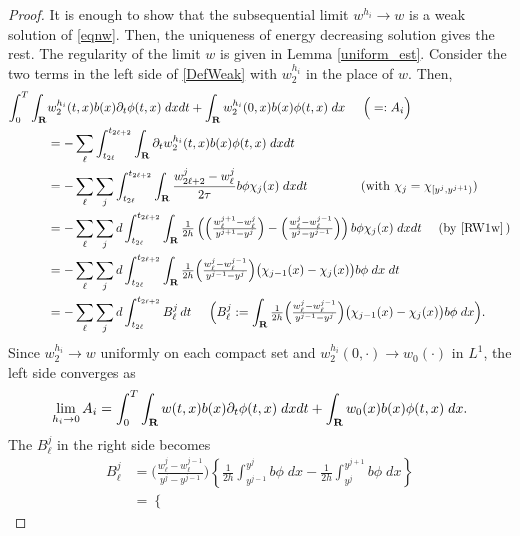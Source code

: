 \documentclass[11pt]{amsart}
\def\R{{\bf R}}
\def\R{{\bf R}}
\begin{document}
\begin{proof}
It is enough to show that the subsequential limit $w^{h_i}\to w$ is a weak solution of \eqref{eqnw}. Then, the uniqueness of energy decreasing solution gives the rest. The regularity of the limit $w$ is given in Lemma \ref{uniform_est}. Consider the two terms in the left side of \eqref{DefWeak} with $w_2^{h_i}$ in the place of $w$. Then,
\begin{align*}
 \int_0^T\int_\R& w_2^{h_i}(t,x)  b(x)\partial_t\phi(t,x)\; dx dt
 +\int_\R w_2^{h_i}(0,x) b(x)\phi(t,x) \; dx\hskip 5mm \Big(=:A_i\Big)\\
 &=-\sum_{\ell}\int_{t_{2\ell}}^{t_{2\ell+2}}\int_\R \partial_t
 w_2^{h_i}(t,x)  b(x)\phi(t,x)\; dx dt \\
 &=-\sum_{\ell}\sum_{j}\int_{t_{2\ell}}^{t_{2\ell+2}}\int_\R
 \frac{w^j_{2\ell+2}-w^j_{\ell}}{2\tau}  b \phi \chi_j(x)\; dx dt \hskip
 1.5cm (\text{with } \chi_j=\chi_{[y^j,y^{j+1})})\\
 &=-\sum_{\ell}\sum_{j}d\int_{t_{2\ell}}^{t_{2\ell+2}}\int_\R
 \tfrac{1}{2h} \left( \Big(\tfrac{w^{j+1}_{\ell} -
 w^{j}_{\ell}}{y^{j+1}-y^j}\Big) -\Big(\tfrac{w^{j}_{\ell} -
 w^{j-1}_{\ell}}{y^{j}-y^{j-1}} \Big)\right)  b \phi \chi_j(x)\; dx
 dt\quad\ (\text{by } \eqref{RW1w}\,)\\
 &=-\sum_{\ell}\sum_{j}d\int_{t_{2\ell}}^{t_{2\ell+2}}\int_\R
 \tfrac{1}{2h} \Big(\tfrac{w^{j}_{\ell} -
 w^{j-1}_{\ell}}{y^{j-1}-y^j}\Big)
 \big(\chi_{j-1}(x)-\chi_{j}(x)\big) b \phi \; dx \;dt\\
 &=-\sum_{\ell}\sum_{j}d\int_{t_{2\ell}}^{t_{2\ell+2}}B_\ell^j\,dt\hskip 5mm\Big(B_\ell^j:=\int_\R \tfrac{1}{2h} \Big(\tfrac{w^{j}_{\ell} -
w^{j-1}_{\ell}}{y^{j-1}-y^j}\Big)
\big(\chi_{j-1}(x)-\chi_{j}(x)\big) b \phi \; dx\Big).
\end{align*}
Since $w_2^{h_i} \rightarrow w$ uniformly on each compact set and
$w_2^{h_i}(0,\cdot) \rightarrow w_0(\cdot)$ in $L^1$, the left side converges as
\begin{align*}
\lim_{h_i\to0}A_i=\int_0^T\int_\R w(t,x)  b(x)\partial_t\phi(t,x)\; dx
dt+\int_\R w_0(x) b(x)\phi(t,x) \; dx.
\end{align*}
The $B^j_\ell$ in the right side becomes
\begin{align*}
 B_\ell^j &= \Big(\tfrac{w^{j}_{\ell} - w^{j-1}_{\ell}}{y^{j}-y^{j-1}}\Big)
        \left\{\frac{1}{2h}\int_{y^{j-1}}^{y^{j}}  b\phi  \; dx -
        \frac{1}{2h}\int_{y^{j}}^{y^{j+1}}  b\phi  \; dx\right\}\\
     &= \left\{\begin{array}{ll}

\end{array}
\end{align*}
\end{proof}
\end{document}
